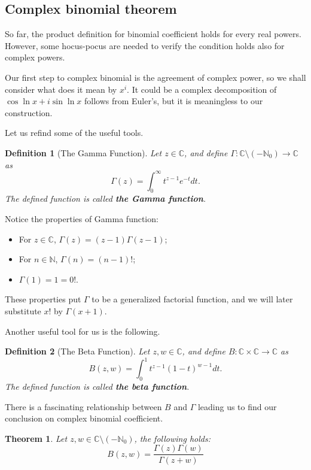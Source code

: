 \documentclass[12pt]{article}
\newtheorem*{definition}{Definition}
\newtheorem*{theorem}{Theorem}
\begin{document}
    \subsection{Complex binomial theorem}

    So far, the product definition for binomial coefficient holds for every real powers. However, some hocus-pocus are needed to verify the condition holds also for complex powers.

    Our first step to complex binomial is the agreement of complex power, so we shall consider what does it mean by $x^i$. It could be a complex decomposition of $\cos{\ln{x}}+i\sin{\ln{x}}$ follows from Euler's, but it is meaningless to our construction. 

    Let us refind some of the useful tools.

    \begin{definition}[The Gamma Function]
        Let $z\in\mathbb{C}$, and define $\Gamma:\mathbb{C}\setminus(-\mathbb{N}_0)\to\mathbb{C}$ as \[\Gamma(z)=\int_{0}^{\infty}t^{z-1}e^{-t}dt.\] The defined function is called \textbf{the Gamma function}.
    \end{definition}

    Notice the properties of Gamma function:\begin{itemize}
        \item For $z\in\mathbb{C}$, $\Gamma(z)=(z-1)\Gamma(z-1)$;
        \item For $n\in\mathbb{N}$, $\Gamma(n)=(n-1)!$;
        \item $\Gamma(1)=1=0!$.
    \end{itemize}

    These properties put $\Gamma$ to be a generalized factorial function, and we will later substitute $x!$ by $\Gamma(x+1)$.

    Another useful tool for us is the following.

    \begin{definition}[The Beta Function]
        Let $z,w\in\mathbb{C}$, and define $B:\mathbb{C}\times\mathbb{C}\to \mathbb{C}$ as \[B(z,w)=\int_0^1 t^{z-1}(1-t)^{w-1}dt.\] The defined function is called \textbf{the beta function}.
    \end{definition}

    There is a fascinating relationship between $B$ and $\Gamma$ leading us to find our conclusion on complex binomial coefficient.

    \begin{theorem}
        Let $z,w\in\mathbb{C}\setminus(-\mathbb{N}_0)$, the following holds: \[B(z,w)=\frac{\Gamma(z)\Gamma(w)}{\Gamma(z+w)}\]
    \end{theorem}
\end{document}
